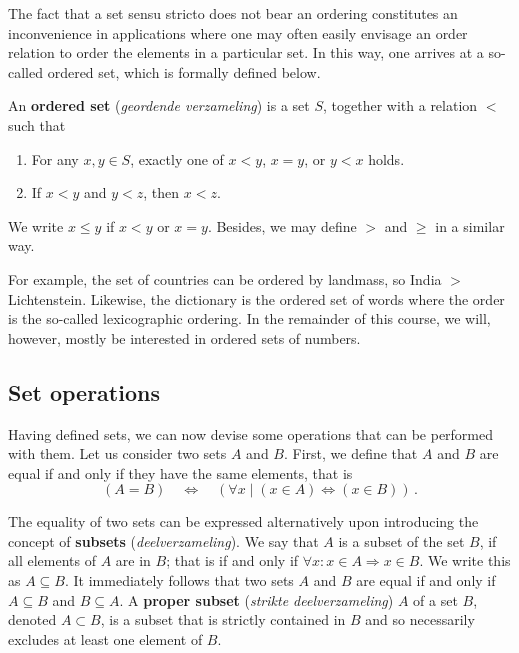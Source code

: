 \ifcourse
\ifanalysis

	The fact that a set sensu stricto does not bear an ordering constitutes an inconvenience in  applications where one may often easily envisage an order relation to order the elements in a particular set.  In this way, one arrives at a so-called ordered set, which is formally defined below. 
	\\
	
	\begin{definition}
		An \textbf{ordered set} (\textit{geordende verzameling}) is a set $S$, together with
		a relation $<$ such that
		\begin{enumerate}
			\item For any $x, y \in S$, exactly one of
			$x < y$, $x=y$, or $y < x$ holds.
			\item If $x < y$ and $y < z$, then $x < z$.
		\end{enumerate}
		We write $x \leq y$ if $x < y$ or $x=y$. Besides, we may define
		$>$ and $\geq$ in a similar way.
	\end{definition}
	For example, the set of countries can be ordered by landmass, so India $>$ Lichtenstein. Likewise, the dictionary is the ordered set of words where the order is the so-called lexicographic ordering.  In the remainder of this course, we will, however, mostly be interested in ordered
	sets of numbers.

\fi
\fi

\subsection{Set operations}
\label{setoperations}
Having defined sets, we can now devise some operations that can be performed with them. Let us consider two sets $A$ and $B$. First, we define that  $A$ and $B$ are equal if and only if they have the same elements, that is
$$
(A=B) \quad\Leftrightarrow\quad \left(\forall x\mid  (x\in A) \Leftrightarrow (x\in B)\right)\,.
$$


The equality of two sets can be expressed alternatively upon introducing the concept of \textbf{subsets} (\textit{deelverzameling}). We say that $A$ is a subset of the set $B$,  if all elements of $A$ are in $B$; that is if and only if $\forall x: x\in A\Rightarrow x\in B$. We write this as $A\subseteq B$. It immediately follows that two sets $A$ and $B$ are equal if and only if $A\subseteq B$ and $B\subseteq A$. A \textbf{proper subset} (\textit{strikte deelverzameling}) $A$ of a set $B$, denoted $A\subset B$, is a subset that is strictly contained in $B$ and so necessarily excludes at least one element of $B$. 

